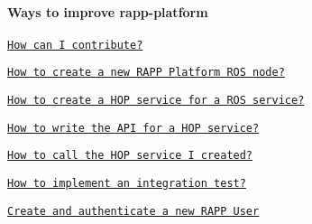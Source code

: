 \paragraph*{Ways to improve rapp-\/platform}


\begin{DoxyItemize}
\item \href{https://github.com/rapp-project/rapp-platform/wiki/How-can-I-contribute%3F}{\tt How can I contribute?}
\item \href{https://github.com/rapp-project/rapp-platform/wiki/How-to-create-a-new-RAPP-Platform-ROS-node%3F}{\tt How to create a new R\-A\-P\-P Platform R\-O\-S node?}
\item \href{https://github.com/rapp-project/rapp-platform/wiki/How-to-create-a-HOP-service-for-a-ROS-service%3F}{\tt How to create a H\-O\-P service for a R\-O\-S service?}
\item \href{https://github.com/rapp-project/rapp-platform/wiki/How-to-write-the-API-for-a-HOP-service%3F}{\tt How to write the A\-P\-I for a H\-O\-P service?}
\item \href{https://github.com/rapp-project/rapp-platform/wiki/How-to-call-the-HOP-service-I-created%3F}{\tt How to call the H\-O\-P service I created?}
\item \href{https://github.com/rapp-project/rapp-platform/wiki/How-to-implement-an-integration-test%3F}{\tt How to implement an integration test?}
\item \href{https://github.com/rapp-project/rapp-platform/wiki/Create-and-authenticate-a-new-RAPP-user}{\tt Create and authenticate a new R\-A\-P\-P User} 
\end{DoxyItemize}